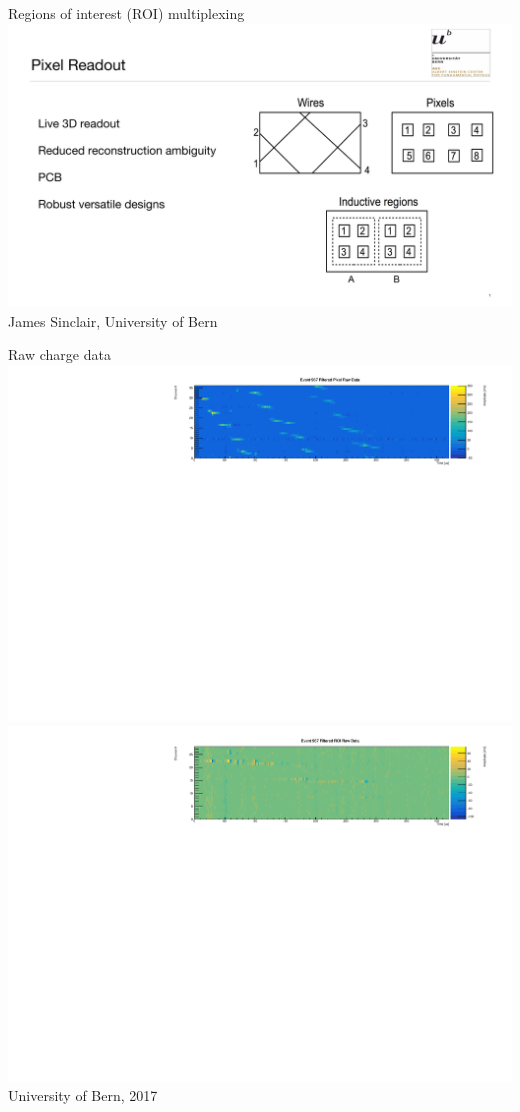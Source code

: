 \documentclass[]{beamer}
\begin{document}
\begin{frame}{Regions of interest (ROI) multiplexing}
	\centering
	\includegraphics[page=2, viewport=20 0 1770 845, clip, width=\textwidth]{defence/Pixels}\\
	{\tiny James Sinclair, University of Bern}\\
\end{frame}

\begin{frame}{Raw charge data}
	\centering
	\includegraphics[width=\textwidth]{defence/event967_rawFilteredPixel_wide}\\
	\includegraphics[width=\textwidth]{defence/event967_rawFilteredROI_wide}\\
	{\tiny University of Bern, 2017}\\
\end{frame}
\end{document}
